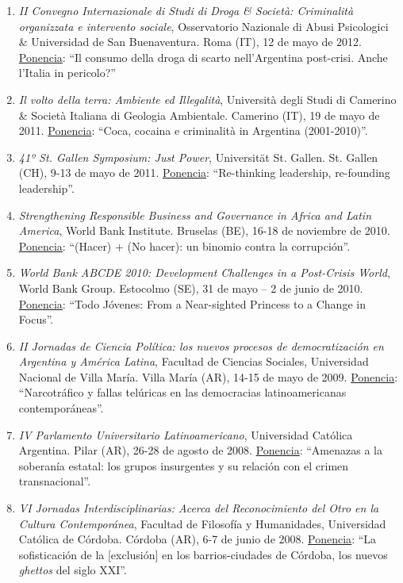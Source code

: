 \documentclass[12pt]{article}
\begin{document}
\begin{enumerate}
\item {\it II Convegno Internazionale di Studi di Droga \& Società: Criminalità organizzata e intervento sociale}, Osservatorio Nazionale di Abusi Psicologici \& Universidad de San Buenaventura. Roma (IT), 12 de mayo de 2012. \underline {Ponencia}: “Il consumo della droga di scarto nell’Argentina post-crisi. Anche l’Italia in pericolo?”

\item {\it Il volto della terra: Ambiente ed Illegalità}, Università degli Studi di Camerino \& Società Italiana di Geologia Ambientale. Camerino (IT), 19 de mayo de 2011. \underline {Ponencia}: “Coca, cocaina e criminalità in Argentina (2001-2010)”.

\item {\it 41º St. Gallen Symposium: Just Power}, Universität St. Gallen. St. Gallen (CH), 9-13 de mayo de 2011. \underline {Ponencia}: “Re-thinking leadership, re-founding leadership”.

\item {\it Strengthening Responsible Business and Governance in Africa and Latin America}, World Bank Institute. Bruselas (BE), 16-18 de noviembre de 2010. \underline {Ponencia}: “(Hacer) + (No hacer): un binomio contra la corrupción”.

\item {\it World Bank ABCDE 2010: Development Challenges in a Post-Crisis World}, World Bank Group. Estocolmo (SE), 31 de mayo – 2 de junio de 2010. \underline {Ponencia}: “Todo Jóvenes: From a Near-sighted Princess to a Change in Focus”. 

\item {\it II Jornadas de Ciencia Política: los nuevos procesos de democratización en Argentina y América Latina}, Facultad de Ciencias Sociales, Universidad Nacional de Villa María. Villa María (AR), 14-15 de mayo de 2009. \underline {Ponencia}: “Narcotráfico y fallas telúricas en las democracias latinoamericanas contemporáneas”.

\item {\it IV Parlamento Universitario Latinoamericano}, Universidad Católica Argentina. Pilar (AR), 26-28 de agosto de 2008. \underline {Ponencia}: “Amenazas a la soberanía estatal: los grupos insurgentes y su relación con el crimen transnacional”.

\item {\it VI Jornadas Interdisciplinarias: Acerca del Reconocimiento del Otro en la Cultura Contemporánea}, Facultad de Filosofía y Humanidades, Universidad Católica de Córdoba. Córdoba (AR), 6-7 de junio de 2008. \underline {Ponencia}: “La sofisticación de la [exclusión] en los barrios-ciudades de Córdoba, los nuevos {\it ghettos} del siglo XXI”.

\end{enumerate}
\end{document}
